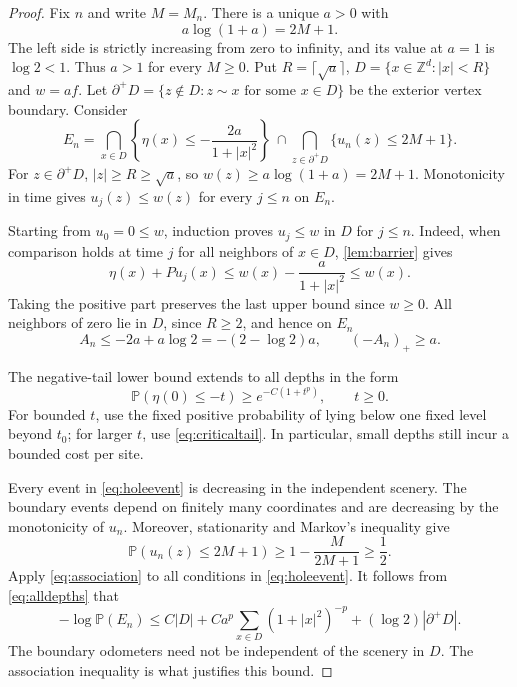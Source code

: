 \documentclass[11pt]{amsart}
\theoremstyle{remark}
\newcommand{\Z}{\mathbb Z}
\newcommand{\Pp}{\mathbb P}
\begin{document}
\begin{proof}
Fix $n$ and write $M=M_n$. There is a unique $a>0$ with
\begin{equation}\label{eq:achoice}
 a\log(1+a)=2M+1.
\end{equation}
The left side is strictly increasing from zero to infinity, and its
value at $a=1$ is $\log2<1$. Thus $a>1$ for every $M\ge0$.
Put $R=\lceil\sqrt a\rceil$, $D=\{x\in\Z^d:|x|<R\}$ and $w=af$.
Let $\partial^+D=\{z\notin D:z\sim x\text{ for some }x\in D\}$
be the exterior vertex boundary. Consider
\begin{equation}\label{eq:holeevent}
 E_n=\bigcap_{x\in D}\left\{\eta(x)\le-\frac{2a}{1+|x|^2}\right\}
 \ \cap\bigcap_{z\in\partial^+D}\{u_n(z)\le2M+1\}.
\end{equation}
For $z\in\partial^+D$, $|z|\ge R\ge\sqrt a$, so
$w(z)\ge a\log(1+a)=2M+1$.
Monotonicity in time gives $u_j(z)\le w(z)$ for every $j\le n$ on $E_n$.

Starting from $u_0=0\le w$, induction proves $u_j\le w$ in $D$ for
$j\le n$. Indeed, when comparison holds at time $j$ for all neighbors
of $x\in D$, \cref{lem:barrier} gives
\[
 \eta(x)+Pu_j(x)\le w(x)-\frac{a}{1+|x|^2}\le w(x).
\]
Taking the positive part preserves the last upper bound since $w\ge0$.
All neighbors of zero lie in $D$, since $R\ge2$, and hence on $E_n$
\begin{equation}\label{eq:forcing}
 A_n\le-2a+a\log2=-(2-\log2)a,\qquad (-A_n)_+\ge a.
\end{equation}

The negative-tail lower bound extends to all depths in the form
\begin{equation}\label{eq:alldepths}
 \Pp(\eta(0)\le-t)\ge e^{-C(1+t^p)},\qquad t\ge0.
\end{equation}
For bounded $t$, use the fixed positive probability of lying below one
fixed level beyond $t_0$; for larger $t$, use \eqref{eq:criticaltail}.
In particular, small depths still incur a bounded cost per site.

Every event in \eqref{eq:holeevent} is decreasing in the independent
scenery. The boundary events depend on finitely many coordinates and
are decreasing by the monotonicity of $u_n$. Moreover, stationarity and
Markov's inequality give
\[
 \Pp(u_n(z)\le2M+1)\ge1-\frac{M}{2M+1}\ge\frac12.
\]
Apply \eqref{eq:association} to all conditions in \eqref{eq:holeevent}.
It follows from \eqref{eq:alldepths} that
\begin{equation}\label{eq:eventcost}
 -\log\Pp(E_n)\le
 C|D|+Ca^p\sum_{x\in D}(1+|x|^2)^{-p}
       +(\log2)|\partial^+D|.
\end{equation}
The boundary odometers need not be independent of the scenery in $D$.
The association inequality is what justifies this bound.


\end{proof}
\end{document}
